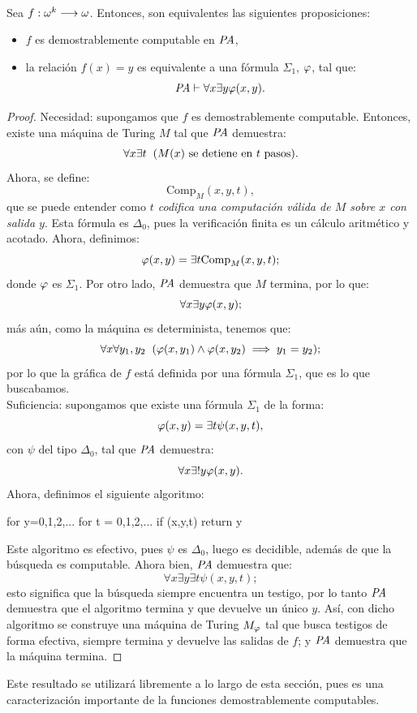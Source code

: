 \begin{thm}\cite{thmsigma1comp}\\
    Sea $f:\omega^k\longrightarrow\omega$. Entonces, son equivalentes las siguientes proposiciones:
    \begin{itemize}
        \item $f$ es demostrablemente computable en $\textit{PA}$,
        \item la relación $f(x)=y$ es equivalente a una fórmula $\Sigma_1$, $\varphi$, tal que:
            \[\textit{PA}\vdash\forall x\exists y\varphi(x,y).\]
    \end{itemize}
\end{thm}
\begin{proof}
    Necesidad: supongamos que $f$ es demostrablemente computable. Entonces, existe una máquina de Turing $M$ tal que $\textit{PA}$ demuestra:
    \[\forall x\exists t\hspace{0.2cm}(M(x)\text{ se detiene en }t\text{ pasos}).\]
    Ahora, se define:
    \[\text{Comp}_M(x,y,t),\]
    que se puede entender como \textit{$t$ codifica una computación válida de $M$ sobre $x$ con salida $y$}. Esta fórmula es $\Delta_0$, pues la verificación finita es un cálculo aritmético y acotado. Ahora, definimos:
    \[\varphi(x,y)=\exists t\text{Comp}_M(x,y,t);\]
    donde $\varphi$ es $\Sigma_1$. Por otro lado, $\textit{PA}$ demuestra que $M$ termina, por lo que:
    \[\forall x\exists y\varphi(x,y);\]
    más aún, como la máquina es determinista, tenemos que:
    \[\forall x\forall y_1,y_2\hspace{0.2cm}(\varphi(x,y_1)\land\varphi(x,y_2)\implies y_1=y_2);\]
    por lo que la gráfica de $f$ está definida por una fórmula $\Sigma_1$, que es lo que buscabamos.\\
    Suficiencia: supongamos que existe una fórmula $\Sigma_1$ de la forma:
    \[\varphi(x,y)=\exists t\psi(x,y,t),\]
    con $\psi$ del tipo $\Delta_0$, tal que $\textit{PA}$ demuestra:
    \[\forall x\exists!y\varphi(x,y).\]
    Ahora, definimos el siguiente algoritmo:
    \begin{center}
    \begin{pseudocodigo}
        for y=0,1,2,... 
            for t = 0,1,2,... 
                if \psi(x,y,t)
                    return y
    \end{pseudocodigo}
    \end{center}
    Este algoritmo es efectivo, pues $\psi$ es $\Delta_0$, luego es decidible, además de que la búsqueda es computable. Ahora bien, $\textit{PA}$ demuestra que:
    \[\forall x\exists y\exists t\psi(x,y,t);\]
    esto significa que la búsqueda siempre encuentra un testigo, por lo tanto $\textit{PA}$ demuestra que el algoritmo termina y que devuelve un único $y$. Así, con dicho algoritmo se construye una  máquina de Turing $M_\varphi$ tal que busca testigos de forma efectiva, siempre termina y devuelve las salidas de $f$; y $\textit{PA}$ demuestra que la máquina termina.
\end{proof}
Este resultado se utilizará libremente a lo largo de esta sección, pues es una caracterización importante de la funciones demostrablemente computables.

